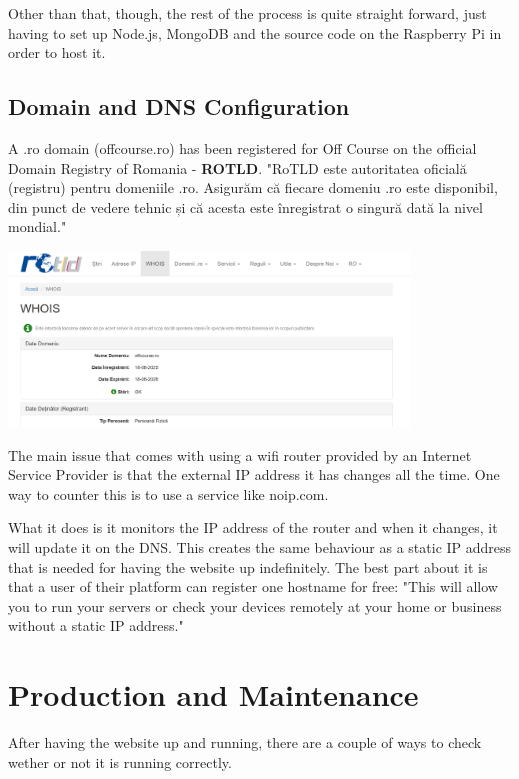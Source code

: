\documentclass[12pt,a4paper]{report}
\begin{document}
Other than that, though, the rest of the process is quite straight forward, just having to set up Node.js, MongoDB and the source code on the Raspberry Pi in order to host it.

\subsection{Domain and DNS Configuration}

A .ro domain (offcourse.ro) has been registered for Off Course on the official Domain Registry of Romania - \textbf{ROTLD}. "RoTLD este autoritatea oficială (registru) pentru domeniile .ro. Asigurăm că fiecare domeniu .ro este disponibil, din punct de vedere tehnic și că acesta este înregistrat o singură dată la nivel mondial."~\cite{roTLD}

\begin{center}
\includegraphics[width=0.8\textwidth]{images/dns.png}
\end{center}

The main issue that comes with using a wifi router provided by an Internet Service Provider is that the external IP address it has changes all the time. One way to counter this is to use a service like noip.com. 

What it does is it monitors the IP address of the router and when it changes, it will update it on the DNS. This creates the same behaviour as a static IP address that is needed for having the website up indefinitely. The best part about it is that a user of their platform can register one hostname for free: "This will allow you to run your servers or check your devices remotely at your home or business without a static IP address."~\cite{noipDNS}

\section{Production and Maintenance}

After having the website up and running, there are a couple of ways to check wether or not it is running correctly. 
\end{document}
